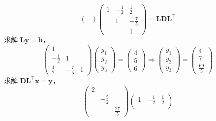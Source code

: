 \documentclass{sjtuarticle}
\begin{document}
\begin{itemize}
\begin{solution}
\begin{equation*}
\begin{pmatrix}
            \end{pmatrix}
            \begin{pmatrix}
                1 & -\frac{1}{2} & \frac{1}{2}\\
                & 1 & -\frac{7}{5}\\
                & & 1
            \end{pmatrix}=\bm{L}\bm{D}\bm{L}^\top
        \end{equation*}
        求解 $\bm{L}\bm{y}=\bm{b}$，
        \begin{equation*}
            \begin{pmatrix}
                1 \\
                -\frac{1}{2} & 1 \\
                \frac{1}{2} & -\frac{7}{5} & 1
            \end{pmatrix}
            \begin{pmatrix}
                y_1 \\
                y_2 \\
                y_3
            \end{pmatrix}=
            \begin{pmatrix}
                4 \\
                5 \\
                6
            \end{pmatrix}\Rightarrow
            \begin{pmatrix}
                y_1 \\
                y_2 \\
                y_3
            \end{pmatrix}=\begin{pmatrix}
                4 \\
                7 \\
                \frac{69}{5}
            \end{pmatrix}
        \end{equation*}
        求解 $\bm{DL}^\top\bm{x}=\bm{y}$，
        \begin{equation*}
            \begin{pmatrix}
                2 \\
                & -\frac{5}{2} \\
                & & \frac{27}{5}
            \end{pmatrix}
            \begin{pmatrix}
                1 & -\frac{1}{2} & \frac{1}{2}\\

\end{pmatrix}
\end{equation*}
\end{solution}
\end{itemize}
\end{document}
